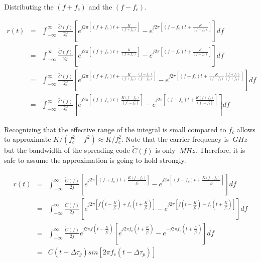 Distributing the $(f+f_c)$ and the $(f-f_c)$.

\begin{eqnarray*}
	r(t) &=& \int_{-\infty}^{\infty} \frac{\tilde{C}(f)}{2j}
	\left[ e^{j 2 \pi [(f + f_c) t + \frac{K}{(f + f_c)}]}
		- e^{j 2 \pi [(f - f_c) t + \frac{K}{(f - f_c)}]} \right] df \\
	&=& \int_{-\infty}^{\infty} \frac{\tilde{C}(f)}{2j}
	\left[ e^{j 2 \pi [(f + f_c) t + \frac{K}{(f + f_c)}]}
		- e^{j 2 \pi [(f - f_c) t + \frac{K}{(f - f_c)}]} \right] df \\
	&=& \int_{-\infty}^{\infty} \frac{\tilde{C}(f)}{2j}
	\left[ e^{j 2 \pi [(f + f_c) t + \frac{K}{(f + f_c)} \frac{(f - f_c)}{(f - f_c)}]}
		- e^{j 2 \pi [(f - f_c) t + \frac{K}{(f - f_c)} \frac{(f + f_c)}{(f + f_c)}]} \right] df \\
	&=& \int_{-\infty}^{\infty} \frac{\tilde{C}(f)}{2j}
	\left[ e^{j 2 \pi [(f + f_c) t + \frac{K(f - f_c)}{(f^2 - f_c^2)}]}
		- e^{j 2 \pi [(f - f_c) t + \frac{K(f + f_c)}{(f^2 - f_c^2)}]} \right] df
\end{eqnarray*}

Recognizing that the effective range of the integral is small compared to $f_c$
allows to approximate $K/(f_c^2 - f^2) \approx K/f_c^2$. Note that the carrier
frequency is $~GHz$ but the bandwidth of the spreading code $\tilde{C}(f)$ is
only $~MHz$. Therefore, it is safe to assume the approximation is going to hold
strongly.

\begin{eqnarray*}
	r(t) &=& \int_{-\infty}^{\infty} \frac{\tilde{C}(f)}{2j}
	\left[ e^{j 2 \pi [(f + f_c) t + \frac{K(f - f_c)}{f_c^2}]}
		- e^{j 2 \pi [(f - f_c) t + \frac{K(f + f_c)}{f_c^2}]} \right] df \\
	&=& \int_{-\infty}^{\infty} \frac{\tilde{C}(f)}{2j}
	\left[ e^{j 2 \pi [f(t - \frac{K}{f_c^2}) + f_c(t + \frac{K}{f_c^2})]}
		- e^{j 2 \pi [f(t - \frac{K}{f_c^2}) - f_c(t + \frac{K}{f_c^2})]} \right] df \\
	&=& \int_{-\infty}^{\infty} \frac{\tilde{C}(f)}{2j}
	e^{j 2 \pi f(t - \frac{K}{f_c^2})}
	\left[ e^{j 2 \pi f_c(t + \frac{K}{f_c^2})}
		- e^{- j 2 \pi f_c(t + \frac{K}{f_c^2})} \right] df \\
	&=& C(t- \Delta\tau_g) sin[2 \pi f_c (t-\Delta\tau_p)]
\end{eqnarray*}
